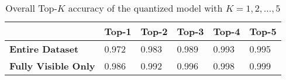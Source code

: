\begin{table}
  \caption{Overall Top-$K$ accuracy of the quantized model with $K = 1, 2, \dots, 5$}
  \label{tab:overall_top_k_inference}
  \centering
  \begin{tabular}{llllll}
    \toprule
     & \textbf{Top-1} & \textbf{Top-2} & \textbf{Top-3} & \textbf{Top-4} & \textbf{Top-5} \\
    \midrule
    \textbf{Entire Dataset} & \num{0.972} & \num{0.983} & \num{0.989} & \num{0.993} & \num{0.995} \\
    \textbf{Fully Visible Only} & \num{0.986} & \num{0.992} & \num{0.996} & \num{0.998} & \num{0.999} \\
    \bottomrule
  \end{tabular}
\end{table}

